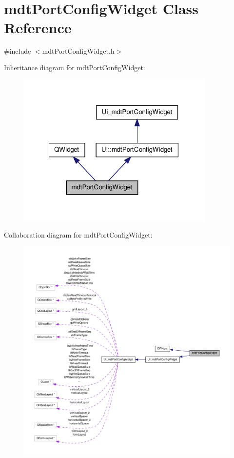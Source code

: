 \hypertarget{classmdt_port_config_widget}{\section{mdt\-Port\-Config\-Widget Class Reference}
\label{classmdt_port_config_widget}
}


{\ttfamily \#include $<$mdt\-Port\-Config\-Widget.\-h$>$}



Inheritance diagram for mdt\-Port\-Config\-Widget\-:\nopagebreak
\begin{figure}[H]
\begin{center}
\leavevmode
\includegraphics[width=278pt]{classmdt_port_config_widget__inherit__graph}
\end{center}
\end{figure}


Collaboration diagram for mdt\-Port\-Config\-Widget\-:\nopagebreak
\begin{figure}[H]
\begin{center}
\leavevmode
\includegraphics[width=350pt]{classmdt_port_config_widget__coll__graph}
\end{center}
\end{figure}
